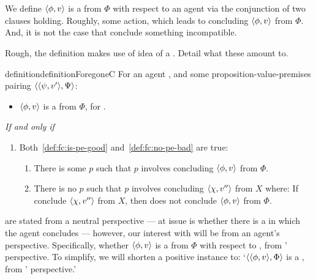 \section{}
\label{cha:sec:fcs-def}

\begin{note}
  We define \(\langle \phi, v \rangle\) is a \emph{} from \(\Phi\) with respect to an agent via the conjunction of two clauses holding.
  Roughly, some action, which leads to concluding \(\langle \phi, v \rangle\) from \(\Phi\).
  And, it is not the case that conclude something incompatible.

  Rough, the definition makes use of idea of a \pevent{}.
  Detail what these amount to.

  \begin{restatable}[A \fc{0}]{definition}{definitionForegoneC}
    \label{def:fc}
    For an agent \vAgent{}, and some proposition-value-premises pairing \(\langle \langle \psi, v' \rangle, \Psi \rangle\):

    \begin{itemize}
    \item
      \(\langle \phi, v \rangle\) is a \emph{} from \(\Phi\), for \vAgent{}.
    \end{itemize}
    \emph{If and only if}
    \begin{enumerate}[label=]
    \item
      Both~\ref{def:fc:is-pe-good} and~\ref{def:fc:no-pe-bad} are true:
      \begin{enumerate}[label=\alph*., ref=(\alph*)]
      \item
        \label{def:fc:is-pe-good}
        There is some \pevent{} \(p\) such that \(p\) involves \vAgent{} concluding \(\langle \phi, v \rangle\) from \(\Phi\).
      \item
        \label{def:fc:no-pe-bad}
        There is no \pevent{} \(p\) such that \(p\) involves \vAgent{} concluding
        \(\langle \chi, v'' \rangle\) from \(X\) where:
        If conclude \(\langle \chi, v'' \rangle\) from \(X\), then does not conclude \(\langle \phi, v \rangle\) from \(\Phi\).
      \end{enumerate}
    \end{enumerate}
    \vspace{-\baselineskip}
  \end{restatable}

   are stated from a neutral perspective --- at issue is whether there is a \pevent{} in which the agent concludes --- however, our interest with  will be from an agent's perspective.
  Specifically, whether \(\langle \phi, v \rangle\) is a  from \(\Phi\) with respect to \vAgent{}, from \vAgent{}' perspective.
  To simplify, we will shorten a positive instance to:
  `\(\langle \langle \phi, v \rangle, \Phi \rangle\) is a , from \vAgent{}' perspective.'
\end{note}

